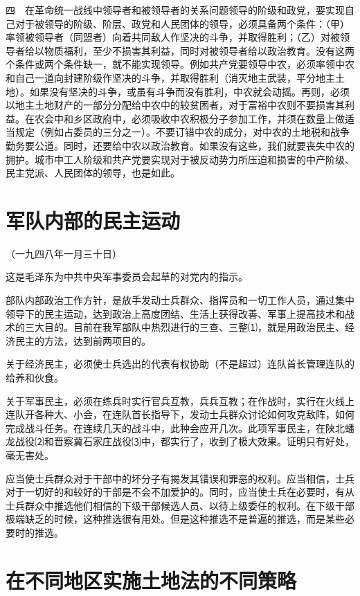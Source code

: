 \documentclass[UTF-8, a5paper, 12pt]{ctexart}
\begin{document}
四　在革命统一战线中领导者和被领导者的关系问题领导的阶级和政党，要实现自己对于被领导的阶级、阶层、政党和人民团体的领导，必须具备两个条件：（甲）率领被领导者（同盟者）向着共同敌人作坚决的斗争，并取得胜利；（乙）对被领导者给以物质福利，至少不损害其利益，同时对被领导者给以政治教育。没有这两个条件或两个条件缺一，就不能实现领导。例如共产党要领导中农，必须率领中农和自己一道向封建阶级作坚决的斗争，并取得胜利（消灭地主武装，平分地主土地）。如果没有坚决的斗争，或虽有斗争而没有胜利，中农就会动摇。再则，必须以地主土地财产的一部分分配给中农中的较贫困者，对于富裕中农则不要损害其利益。在农会中和乡区政府中，必须吸收中农积极分子参加工作，并须在数量上做适当规定（例如占委员的三分之一）。不要订错中农的成分，对中农的土地税和战争勤务要公道。同时，还要给中农以政治教育。如果没有这些，我们就要丧失中农的拥护。城市中工人阶级和共产党要实现对于被反动势力所压迫和损害的中产阶级、民主党派、人民团体的领导，也是如此。

\section{军队内部的民主运动}

（一九四八年一月三十日）

这是毛泽东为中共中央军事委员会起草的对党内的指示。

部队内部政治工作方针，是放手发动士兵群众、指挥员和一切工作人员，通过集中领导下的民主运动，达到政治上高度团结、生活上获得改善、军事上提高技术和战术的三大目的。目前在我军部队中热烈进行的三查、三整⑴，就是用政治民主、经济民主的方法，达到前两项目的。

关于经济民主，必须使士兵选出的代表有权协助（不是超过）连队首长管理连队的给养和伙食。

关于军事民主，必须在练兵时实行官兵互教，兵兵互教；在作战时，实行在火线上连队开各种大、小会，在连队首长指导下，发动士兵群众讨论如何攻克敌阵，如何完成战斗任务。在连续几天的战斗中，此种会应开几次。此项军事民主，在陕北蟠龙战役⑵和晋察冀石家庄战役⑶中，都实行了，收到了极大效果。证明只有好处，毫无害处。

应当使士兵群众对于干部中的坏分子有揭发其错误和罪恶的权利。应当相信，士兵对于一切好的和较好的干部是不会不加爱护的。同时，应当使士兵在必要时，有从士兵群众中推选他们相信的下级干部候选人员、以待上级委任的权利。在下级干部极端缺乏的时候，这种推选很有用处。但是这种推选不是普遍的推选，而是某些必要时的推选。


\section{在不同地区实施土地法的不同策略}
\end{document}
